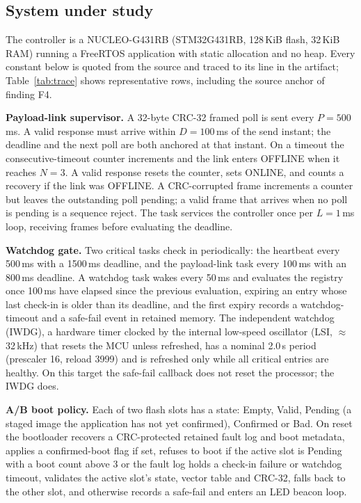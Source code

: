 \documentclass[conference,a4paper]{IEEEtran}
\begin{document}
\subsection{System under study}
\label{sec:system}
The controller is a NUCLEO-G431RB (STM32G431RB, 128\,KiB flash, 32\,KiB RAM) running a FreeRTOS application with static allocation and no heap. Every constant below is quoted from the source and traced to its line in the artifact; Table~\ref{tab:trace} shows representative rows, including the source anchor of finding F4.

\textbf{Payload-link supervisor.} A 32-byte CRC-32 framed poll is sent every $P=500$\,ms. A valid response must arrive within $D=100$\,ms of the send instant; the deadline and the next poll are both anchored at that instant. On a timeout the consecutive-timeout counter increments and the link enters OFFLINE when it reaches $N=3$. A valid response resets the counter, sets ONLINE, and counts a recovery if the link was OFFLINE. A CRC-corrupted frame increments a counter but leaves the outstanding poll pending; a valid frame that arrives when no poll is pending is a sequence reject. The task services the controller once per $L=1$\,ms loop, receiving frames before evaluating the deadline.

\textbf{Watchdog gate.} Two critical tasks check in periodically: the heartbeat every 500\,ms with a 1500\,ms deadline, and the payload-link task every 100\,ms with an 800\,ms deadline. A watchdog task wakes every 50\,ms and evaluates the registry once 100\,ms have elapsed since the previous evaluation, expiring an entry whose last check-in is older than its deadline, and the first expiry records a watchdog-timeout and a safe-fail event in retained memory. The independent watchdog (IWDG), a hardware timer clocked by the internal low-speed oscillator (LSI, $\approx$32\,kHz) that resets the MCU unless refreshed, has a nominal 2.0\,s period (prescaler 16, reload 3999) and is refreshed only while all critical entries are healthy. On this target the safe-fail callback does not reset the processor; the IWDG does.

\textbf{A/B boot policy.} Each of two flash slots has a state: Empty, Valid, Pending (a staged image the application has not yet confirmed), Confirmed or Bad. On reset the bootloader recovers a CRC-protected retained fault log and boot metadata, applies a confirmed-boot flag if set, refuses to boot if the active slot is Pending with a boot count above 3 or the fault log holds a check-in failure or watchdog timeout, validates the active slot's state, vector table and CRC-32, falls back to the other slot, and otherwise records a safe-fail and enters an LED beacon loop.
\end{document}
